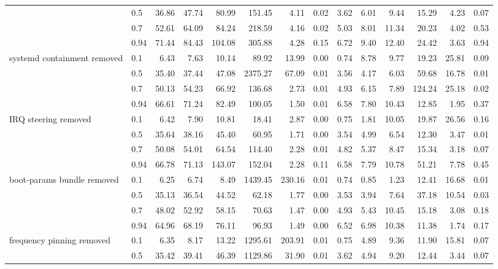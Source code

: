\begin{table}
{\begin{tabular}{llrrrrrrrrrrrr}
 & 0.5 & 36.86 & 47.74 & 80.99 & 151.45 & 4.11 & 0.02 & 3.62 & 6.01 & 9.44 & 15.29 & 4.23 & 0.07 \\
 & 0.7 & 52.61 & 64.09 & 84.24 & 218.59 & 4.16 & 0.02 & 5.03 & 8.01 & 11.34 & 20.23 & 4.02 & 0.53 \\
 & 0.94 & 71.44 & 84.43 & 104.08 & 305.88 & 4.28 & 0.15 & 6.72 & 9.40 & 12.40 & 24.42 & 3.63 & 0.94 \\
\cmidrule{1-14}
\multirow[t]{4}{*}{systemd containment removed} & 0.1 & 6.43 & 7.63 & 10.14 & 89.92 & 13.99 & 0.00 & 0.74 & 8.78 & 9.77 & 19.23 & 25.81 & 0.09 \\
 & 0.5 & 35.40 & 37.44 & 47.08 & 2375.27 & 67.09 & 0.01 & 3.56 & 4.17 & 6.03 & 59.68 & 16.78 & 0.01 \\
 & 0.7 & 50.13 & 54.23 & 66.92 & 136.68 & 2.73 & 0.01 & 4.93 & 6.15 & 7.89 & 124.24 & 25.18 & 0.02 \\
 & 0.94 & 66.61 & 71.24 & 82.49 & 100.05 & 1.50 & 0.01 & 6.58 & 7.80 & 10.43 & 12.85 & 1.95 & 0.37 \\
\cmidrule{1-14}
\multirow[t]{4}{*}{IRQ steering removed} & 0.1 & 6.42 & 7.90 & 10.81 & 18.41 & 2.87 & 0.00 & 0.75 & 1.81 & 10.05 & 19.87 & 26.56 & 0.16 \\
 & 0.5 & 35.64 & 38.16 & 45.40 & 60.95 & 1.71 & 0.00 & 3.54 & 4.99 & 6.54 & 12.30 & 3.47 & 0.01 \\
 & 0.7 & 50.08 & 54.01 & 64.54 & 114.40 & 2.28 & 0.01 & 4.82 & 5.37 & 8.47 & 15.34 & 3.18 & 0.07 \\
 & 0.94 & 66.78 & 71.13 & 143.07 & 152.04 & 2.28 & 0.11 & 6.58 & 7.79 & 10.78 & 51.21 & 7.78 & 0.45 \\
\cmidrule{1-14}
\multirow[t]{4}{*}{boot-params bundle removed} & 0.1 & 6.25 & 6.74 & 8.49 & 1439.45 & 230.16 & 0.01 & 0.74 & 0.85 & 1.23 & 12.41 & 16.68 & 0.01 \\
 & 0.5 & 35.13 & 36.54 & 44.52 & 62.18 & 1.77 & 0.00 & 3.53 & 3.94 & 7.64 & 37.18 & 10.54 & 0.03 \\
 & 0.7 & 48.02 & 52.92 & 58.15 & 70.63 & 1.47 & 0.00 & 4.93 & 5.43 & 10.45 & 15.18 & 3.08 & 0.18 \\
 & 0.94 & 64.96 & 68.19 & 76.11 & 96.93 & 1.49 & 0.00 & 6.52 & 6.98 & 10.38 & 11.38 & 1.74 & 0.17 \\
\cmidrule{1-14}
\multirow[t]{4}{*}{frequency pinning removed} & 0.1 & 6.35 & 8.17 & 13.22 & 1295.61 & 203.91 & 0.01 & 0.75 & 4.89 & 9.36 & 11.90 & 15.81 & 0.07 \\
 & 0.5 & 35.42 & 39.41 & 46.39 & 1129.86 & 31.90 & 0.01 & 3.62 & 4.94 & 9.20 & 12.44 & 3.44 & 0.07 \\

\end{tabular}}
\end{table}
